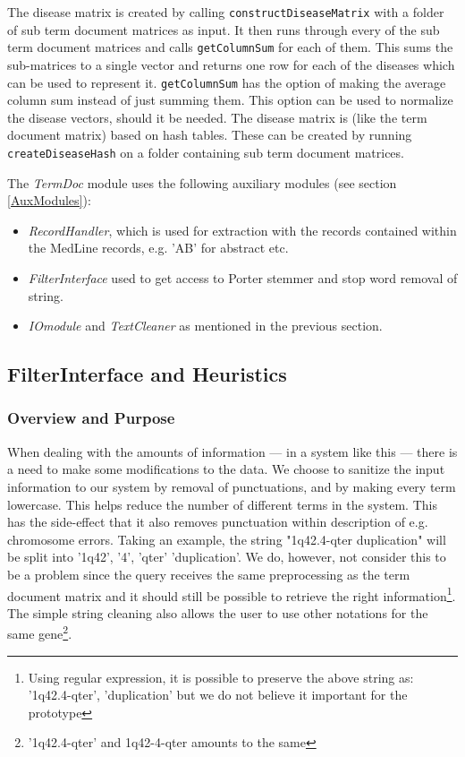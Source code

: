 The disease matrix is created by calling
\texttt{constructDiseaseMatrix} with a folder of sub term document
matrices as input. It then runs through every of the sub term document
matrices and calls \texttt{getColumnSum} for each of them. This sums
the sub-matrices to a single vector and returns one row for each of
the diseases which can be used to represent it. \texttt{getColumnSum}
has the option of making the average column sum instead of just
summing them. This option can be used to normalize the disease
vectors, should it be needed. The disease matrix is (like the term
document matrix) based on hash tables. These can be created by running
\texttt{createDiseaseHash} on a folder containing sub term document
matrices.

The \textit{TermDoc} module uses the following auxiliary modules (see
section \ref{AuxModules}):

\begin{itemize}
  \item \textit{RecordHandler}, which is used for extraction with the
    records contained within the MedLine records, e.g. 'AB' for
    abstract etc.
  \item \textit{FilterInterface} used to get access to Porter stemmer
    and stop word removal of string.
  \item \textit{IOmodule} and \textit{TextCleaner} as mentioned in the
    previous section.
\end{itemize}

\subsection{FilterInterface and Heuristics}

\subsubsection{Overview and Purpose}
When dealing with the amounts of information --- in a system like this ---
there is a need to make some modifications to the data. We choose to
sanitize the input information to our system by removal of
punctuations, and by making every term lowercase. This
helps reduce the number of different terms in the system. This has the
side-effect that it also removes punctuation within description of
e.g. chromosome errors. Taking an example, the string "1q42.4-qter
duplication" will be split into '1q42', '4', 'qter' 'duplication'. We
do, however, not consider this to be a problem since the query
receives the same preprocessing as the term document matrix and it
should still be possible to retrieve the right
information\footnote{Using regular expression, it is possible to
  preserve the above string as: '1q42.4-qter', 'duplication' but we do
  not believe it important for the prototype}. The simple string
cleaning also allows the user to use other notations for the same
gene\footnote{'1q42.4-qter' and 1q42-4-qter amounts to the same}.

